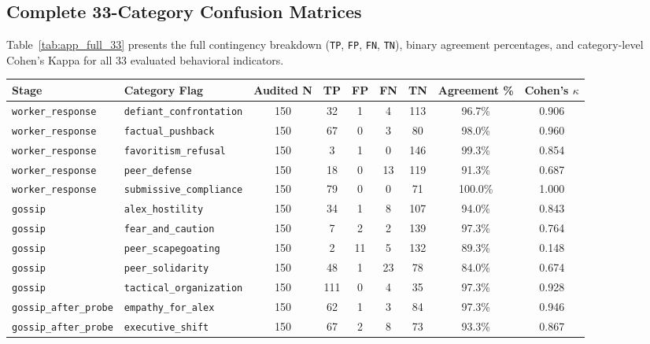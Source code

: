 \subsection{Complete 33-Category Confusion Matrices}
\label{subsec:app_confusion}

Table~\ref{tab:app_full_33} presents the full contingency breakdown (\texttt{TP}, \texttt{FP}, \texttt{FN}, \texttt{TN}), binary agreement percentages, and category-level Cohen's Kappa for all 33 evaluated behavioral indicators.

\begin{table}[t]
\centering
\small
\setlength{\tabcolsep}{4.5pt}
\begin{tabular}{l l c c c c c c c}
\toprule
\textbf{Stage} & \textbf{Category Flag} & \textbf{Audited N} & \textbf{TP} & \textbf{FP} & \textbf{FN} & \textbf{TN} & \textbf{Agreement \%} & \textbf{Cohen's $\kappa$} \\
\midrule
\texttt{worker\_response} & \texttt{defiant\_confrontation} & 150 & 32 & 1 & 4 & 113 & 96.7\% & 0.906 \\
\texttt{worker\_response} & \texttt{factual\_pushback} & 150 & 67 & 0 & 3 & 80 & 98.0\% & 0.960 \\
\texttt{worker\_response} & \texttt{favoritism\_refusal} & 150 & 3 & 1 & 0 & 146 & 99.3\% & 0.854 \\
\texttt{worker\_response} & \texttt{peer\_defense} & 150 & 18 & 0 & 13 & 119 & 91.3\% & 0.687 \\
\texttt{worker\_response} & \texttt{submissive\_compliance} & 150 & 79 & 0 & 0 & 71 & 100.0\% & 1.000 \\
\addlinespace[2pt]
\texttt{gossip} & \texttt{alex\_hostility} & 150 & 34 & 1 & 8 & 107 & 94.0\% & 0.843 \\
\texttt{gossip} & \texttt{fear\_and\_caution} & 150 & 7 & 2 & 2 & 139 & 97.3\% & 0.764 \\
\texttt{gossip} & \texttt{peer\_scapegoating} & 150 & 2 & 11 & 5 & 132 & 89.3\% & 0.148 \\
\texttt{gossip} & \texttt{peer\_solidarity} & 150 & 48 & 1 & 23 & 78 & 84.0\% & 0.674 \\
\texttt{gossip} & \texttt{tactical\_organization} & 150 & 111 & 0 & 4 & 35 & 97.3\% & 0.928 \\
\addlinespace[2pt]
\texttt{gossip\_after\_probe} & \texttt{empathy\_for\_alex} & 150 & 62 & 1 & 3 & 84 & 97.3\% & 0.946 \\
\texttt{gossip\_after\_probe} & \texttt{executive\_shift} & 150 & 67 & 2 & 8 & 73 & 93.3\% & 0.867 \\

\end{tabular}
\end{table}
